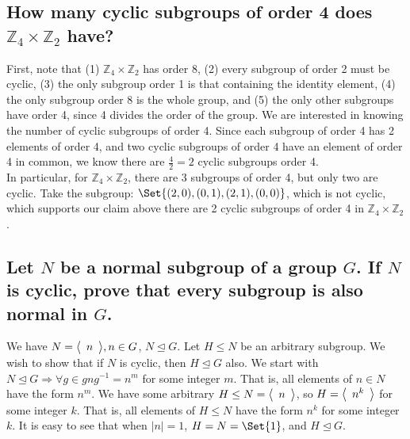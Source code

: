 \documentclass{article}
\newcommand{\Z}{\mathbb{Z}}
\begin{document}
  \subsection{How many cyclic subgroups of order 4 does $\Z_4 \times \Z_2$ have?}

  \newcommand{\zf}{\Z_4 \times \Z_2}

  First, note that (1) $\zf$ has order 8, (2) every subgroup of order 2 must be cyclic, (3) the only subgroup order 1 is that containing the identity element, (4) the only subgroup order 8 is the whole group, and (5) the only other subgroups have order 4, since 4 divides the order of the group.  We are interested in knowing the number of cyclic subgroups of order 4.  Since each subgroup of order 4 has 2 elements of order 4, and two cyclic subgroups of order 4 have an element of order 4 in common, we know there are $\frac{4}{2} = 2$ cyclic subgroups order 4.  \\

  In particular, for $\zf$, there are 3 subgroups of order 4, but only two are cyclic.  Take the subgroup: $\Set{(2,0),(0,1),(2,1),(0,0)}$, which is not cyclic, which supports our claim above there are 2 cyclic subgroups of order 4 in $\zf$.




  \subsection{Let $N$ be a normal subgroup of a group $G$.  If $N$ is cyclic, prove that every subgroup is also normal in $G$.}

  \newcommand{\cyc}[1]{\scaleleftright[1ex]{\langle}{\begin{array}{c}{#1}\end{array}}{\rangle}}






    We have $N = \cyc{n}, n \in G$, $N \trianglelefteq G$.  Let $H \leq N$ be an arbitrary subgroup.  We wish to show that if $N$ is cyclic, then $H \trianglelefteq G$ also.  We start with $N \trianglelefteq G \Longrightarrow \forall g \in gng^{-1} = n^m$ for some integer $m$.  That is, all elements of $n \in N$ have the form $n^m$.  We have some arbitrary $H \leq N = \cyc{n}$, so $H = \cyc{n^k}$ for some integer $k$.  That is, all elements of $H \leq N$ have the form $n^k$ for some integer $k$.  It is easy to see that when $|n| = 1$, $H = N = \Set{1}$, and $H \trianglelefteq G$.  \\
\end{document}
